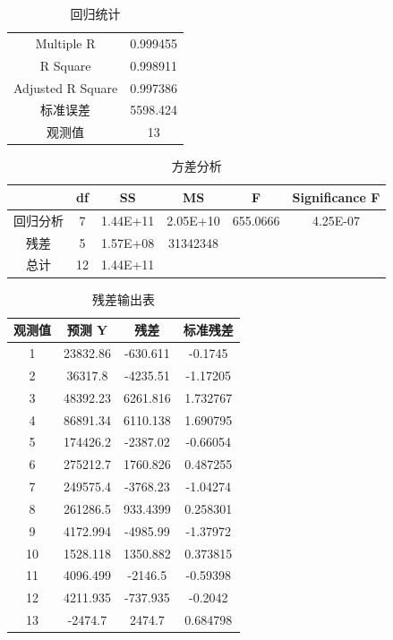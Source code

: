 \documentclass[12pt]{article}%
\begin{document}
\begin{table}[htbp]
  \centering
  \caption{回归统计}
    \begin{tabular}{cc}
    \hline
    Multiple R & 0.999455 \bigstrut[t]\\
    R Square & 0.998911 \\
    Adjusted R Square & 0.997386 \\
    标准误差 & 5598.424 \\
    观测值 & 13 \bigstrut[b]\\
    \hline
    \end{tabular}%
  \label{tab:addlabel}%
\end{table}%

\begin{table}[htbp]
  \centering
  \caption{方差分析}
    \begin{tabular}{cccccc}
    \hline
       & df & SS & MS & F  & Significance F \bigstrut\\
    \hline
    回归分析 & 7  & 1.44E+11 & 2.05E+10 & 655.0666 & 4.25E-07 \bigstrut[t]\\
    残差 & 5  & 1.57E+08 & 31342348 &    &  \\
    总计 & 12 & 1.44E+11 &    &    &  \bigstrut[b]\\
    \hline
    \end{tabular}%
  \label{tab:addlabel}%
\end{table}%

\begin{table}[htbp]
  \centering
  \caption{残差输出表}
    \begin{tabular}{cccc}
    \hline
    观测值 & 预测 Y & 残差 & 标准残差 \bigstrut\\
    \hline
    1  & 23832.86 & -630.611 & -0.1745 \bigstrut[t]\\
    2  & 36317.8 & -4235.51 & -1.17205 \\
    3  & 48392.23 & 6261.816 & 1.732767 \\
    4  & 86891.34 & 6110.138 & 1.690795 \\
    5  & 174426.2 & -2387.02 & -0.66054 \\
    6  & 275212.7 & 1760.826 & 0.487255 \\
    7  & 249575.4 & -3768.23 & -1.04274 \\
    8  & 261286.5 & 933.4399 & 0.258301 \\
    9  & 4172.994 & -4985.99 & -1.37972 \\
    10 & 1528.118 & 1350.882 & 0.373815 \\
    11 & 4096.499 & -2146.5 & -0.59398 \\
    12 & 4211.935 & -737.935 & -0.2042 \\
    13 & -2474.7 & 2474.7 & 0.684798 \bigstrut[b]\\
    \hline
    \end{tabular}%
  \label{tab:addlabel}%
\end{table}%
\end{document}
